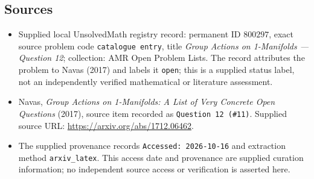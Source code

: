 \documentclass[11pt]{article}
\begin{document}
\subsection{Sources}
\begin{itemize}
\item Supplied local UnsolvedMath registry record: permanent ID \(800297\), exact source problem code \texttt{catalogue entry}, title \emph{Group Actions on 1-Manifolds --- Question 12}; collection: AMR Open Problem Lists. The record attributes the problem to Navas (2017) and labels it \texttt{open}; this is a supplied status label, not an independently verified mathematical or literature assessment.
\item Navas, \emph{Group Actions on 1-Manifolds: A List of Very Concrete Open Questions} (2017), source item recorded as \texttt{Question 12 (\#11)}. Supplied source URL: \url{https://arxiv.org/abs/1712.06462}.
\item The supplied provenance records \texttt{Accessed: 2026-10-16} and extraction method \texttt{arxiv\_latex}. This access date and provenance are supplied curation information; no independent source access or verification is asserted here.
\end{itemize}
\end{document}
